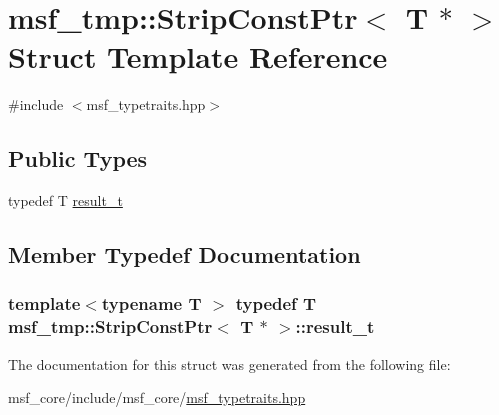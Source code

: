 \hypertarget{structmsf__tmp_1_1StripConstPtr_3_01T_01_5_01_4}{\section{msf\-\_\-tmp\-:\-:Strip\-Const\-Ptr$<$ T $\ast$ $>$ Struct Template Reference}
\label{structmsf__tmp_1_1StripConstPtr_3_01T_01_5_01_4}
}


{\ttfamily \#include $<$msf\-\_\-typetraits.\-hpp$>$}

\subsection*{Public Types}
\begin{DoxyCompactItemize}
\item 
typedef T \hyperlink{structmsf__tmp_1_1StripConstPtr_3_01T_01_5_01_4_a488d62f2859f809b9dc13e5e99a81582}{result\-\_\-t}
\end{DoxyCompactItemize}


\subsection{Member Typedef Documentation}
\hypertarget{structmsf__tmp_1_1StripConstPtr_3_01T_01_5_01_4_a488d62f2859f809b9dc13e5e99a81582}{
\subsubsection[{result\-\_\-t}]{\setlength{\rightskip}{0pt plus 5cm}template$<$typename T $>$ typedef T {\bf msf\-\_\-tmp\-::\-Strip\-Const\-Ptr}$<$ T $\ast$ $>$\-::{\bf result\-\_\-t}}}\label{structmsf__tmp_1_1StripConstPtr_3_01T_01_5_01_4_a488d62f2859f809b9dc13e5e99a81582}


The documentation for this struct was generated from the following file\-:\begin{DoxyCompactItemize}
\item 
msf\-\_\-core/include/msf\-\_\-core/\hyperlink{msf__typetraits_8hpp}{msf\-\_\-typetraits.\-hpp}\end{DoxyCompactItemize}
